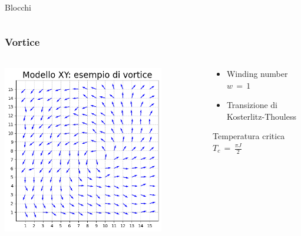 \begin{frame}
\begin{columns}
\begin{column}{0.33\textwidth}
\begin{block}{Blocchi}
            \end{block}        
        \end{column}
    \end{columns}
\end{frame}



\begin{frame}
    \frametitle{Vortice}
    \framesubtitle{}

    \begin{columns}
        \begin{column}{0.5\textwidth}
            \centering
            \includegraphics[width=0.8\textwidth]{Immagini/simXY/conf_vortice.png}
        \end{column}
    
        \begin{column}{0.5\textwidth}
            \begin{itemize}[itemsep=0.5em, label=$\diamond$]
                \item Winding number $w\,=\,1$
                \item Transizione di Kosterlitz-Thouless
            \end{itemize}
        \vspace{12pt}

        \begin{block}{Temperatura critica}
            \centering
            $T_c\,=\,\frac{\pi J}{2} $
        \end{block}
        \end{column}
    \end{columns}

\end{frame}



